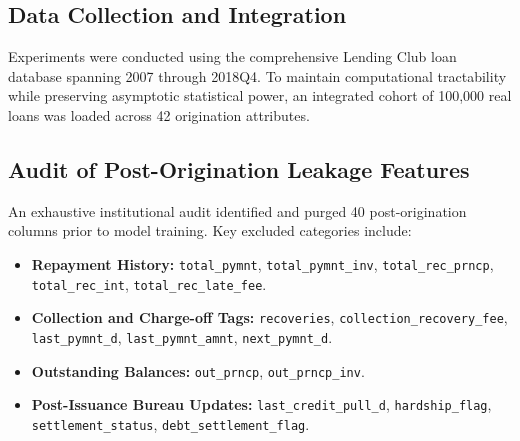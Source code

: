 \documentclass[conference]{IEEEtran}
\begin{document}
\subsection{Data Collection and Integration}
Experiments were conducted using the comprehensive Lending Club loan database spanning 2007 through 2018Q4. To maintain computational tractability while preserving asymptotic statistical power, an integrated cohort of 100,000 real loans was loaded across 42 origination attributes.

\subsection{Audit of Post-Origination Leakage Features}
An exhaustive institutional audit identified and purged 40 post-origination columns prior to model training. Key excluded categories include:
\begin{itemize}
    \item \textbf{Repayment History:} \texttt{total\_pymnt}, \texttt{total\_pymnt\_inv}, \texttt{total\_rec\_prncp}, \texttt{total\_rec\_int}, \texttt{total\_rec\_late\_fee}.
    \item \textbf{Collection and Charge-off Tags:} \texttt{recoveries}, \texttt{collection\_recovery\_fee}, \texttt{last\_pymnt\_d}, \texttt{last\_pymnt\_amnt}, \texttt{next\_pymnt\_d}.
    \item \textbf{Outstanding Balances:} \texttt{out\_prncp}, \texttt{out\_prncp\_inv}.
    \item \textbf{Post-Issuance Bureau Updates:} \texttt{last\_credit\_pull\_d}, \texttt{hardship\_flag}, \texttt{settlement\_status}, \texttt{debt\_settlement\_flag}.
\end{itemize}
\end{document}
